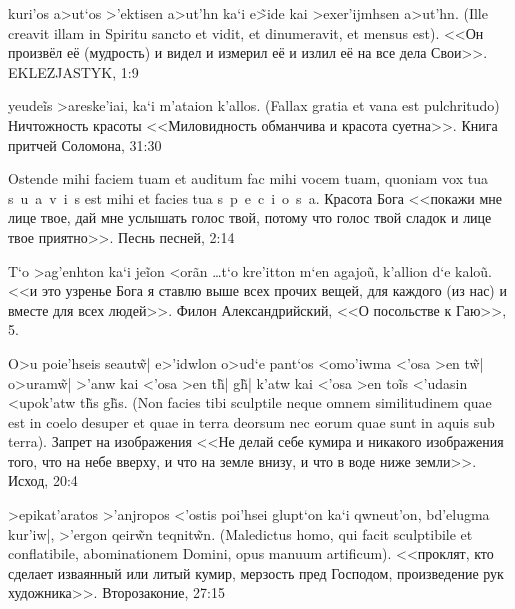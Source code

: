 \begin{theorem}\label{cyt:tyk1:9}%
\textnormal{\textgreek{kuri'os a>ut`os >'ektisen a>ut'hn ka`i e\~>ide kai >exer'ijmhsen a>ut'hn.}
(Ille creavit illam in Spiritu sancto et vidit, et dinumeravit, et mensus est).
<<Он произвёл её (мудрость) и видел и измерил её и излил её на все дела Свои>>. 
EKLEZJASTYK, 1:9 %
}
\end{theorem}

\begin{theorem}\label{cyt:prit31:30}%
\textnormal{\textgreek{yeude\~is >areske'iai, ka`i m'ataion k'allos.}
(Fallax gratia et vana est pulchritudo)
Ничтожность красоты
<<Миловидность обманчива и красота суетна>>. 
Книга притчей Соломона, 31:30}
\end{theorem}

\begin{theorem}\label{cyt:prit2:14}%
\textnormal{{Ostende mihi faciem tuam et auditum fac mihi vocem tuam, quoniam vox tua s~u~a~v~i~s est mihi et facies tua s~p~e~c~i~o~s~a.}
Красота Бога %
<<покажи мне лице твое, дай мне услышать голос твой, потому что голос твой сладок и лице твое приятно>>.
Песнь песней, 2:14}
\end{theorem}

\begin{theorem}\label{cyt:gaj5}%
\textnormal{\textgreek{T`o >ag'enhton ka`i je\~ion <or\~an \ldots t`o kre'itton m`en agajo\~u, k'allion d`e kalo\~u.}
<<и это узренье Бога я ставлю выше всех прочих вещей, для каждого (из нас) и вместе для всех людей>>.
Филон Александрийский, <<О посольстве к Гаю>>, 5.}
\end{theorem}

\begin{theorem}\label{cyt:ish20:4}%
\textnormal{\textgreek{O>u poie'hseis seaut\~w| e>'idwlon o>ud`e pant`os <omo'iwma <'osa >en t\~w| o>uram\~w| >'anw kai <'osa >en t\~h| g\~h| k'atw kai <'osa >en to\~is <'udasin <upok'atw t\~hs g\~hs.}
(Non facies tibi sculptile neque omnem similitudinem quae est in coelo desuper et quae in terra deorsum nec eorum quae sunt in aquis sub terra).
Запрет на изображения
<<Не делай себе кумира и никакого изображения того, что на небе вверху, и что на земле внизу, и что в воде ниже земли>>. 
Исход, 20:4}
\end{theorem}

\begin{theorem}\label{cyt:wtor27:15}%
\textnormal{\textgreek{>epikat'aratos >'anjropos <'ostis poi'hsei glupt`on ka`i qwneut'on, bd'elugma kur'iw|, >'ergon qeir\~wn teqnit\~wn.}
(Maledictus homo, qui facit sculptibile et conflatibile, abominationem Domini, opus manuum artificum).
<<проклят, кто сделает изваянный или литый кумир, мерзость пред Господом, произведение рук художника>>.
Второзаконие, 27:15}
\end{theorem}

